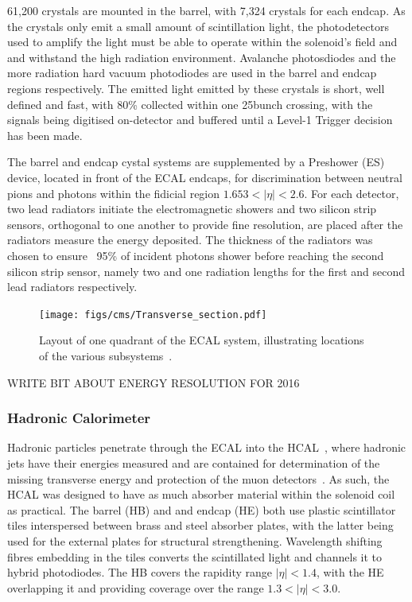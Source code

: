 61,200 crystals are mounted in the barrel, with 7,324 crystals for each endcap.
As the crystals only emit a small amount of scintillation light, the photodetectors used to amplify the light must be able to operate within the solenoid's field and and withstand the high radiation environment.
Avalanche photosdiodes and the more radiation hard vacuum photodiodes are used in the barrel and endcap regions respectively.
The emitted light emitted by these crystals is short, well defined and fast, with 80\% collected within one 25\ns bunch crossing, with the signals being digitised on-detector and buffered until a Level-1 Trigger decision has been made.

The barrel and endcap cystal systems are supplemented by a Preshower (ES)~\cite{Loos:539819} device, located in front of the ECAL endcaps, for discrimination between neutral pions and photons within the fidicial region $1.653 < |\eta| < 2.6$.
For each detector, two lead radiators initiate the electromagnetic showers and two silicon strip sensors, orthogonal to one another to provide fine resolution, are placed after the radiators measure the energy deposited.
The thickness of the radiators was chosen to ensure ~95\% of incident photons shower before reaching the second silicon strip sensor, namely two and one radiation lengths for the first and second lead radiators respectively.

\begin{figure}[htbp]
\begin{center}
\texttt{[image: figs/cms/Transverse\_section.pdf]}
\caption{Layout of one quadrant of the ECAL system, illustrating locations of the various subsystems~\cite{Bayatian:2006nff}.}
\label{fig:muonChambers}
\end{center}
\end{figure}


WRITE BIT ABOUT ENERGY RESOLUTION FOR 2016


\subsubsection{Hadronic Calorimeter}\label{subsubsec:HCAL}
Hadronic particles penetrate through the ECAL into the HCAL~\cite{CMS:1997xji}, where hadronic jets have their energies measured and are contained for determination of the missing transverse energy and protection of the muon detectors~\cite{HCAL:tdr}.
As such, the HCAL was designed to have as much absorber material within the solenoid coil as practical. 
The barrel (HB) and and endcap (HE) both use plastic scintillator tiles interspersed between brass and steel absorber plates, with the latter being used for the external plates for structural strengthening.
Wavelength shifting fibres embedding in the tiles converts the scintillated light and channels it to hybrid photodiodes.
The HB covers the rapidity range $|\eta| < 1.4$, with the HE overlapping it and providing coverage over the range $1.3 < |\eta| < 3.0$.

